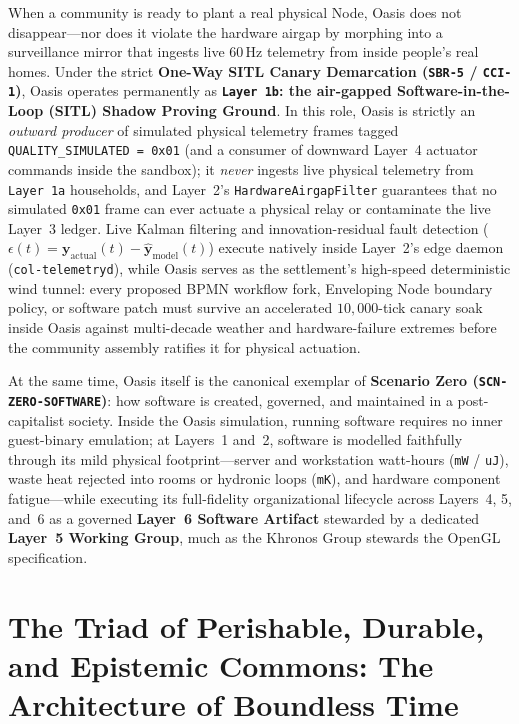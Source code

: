 When a community is ready to plant a real physical Node, Oasis does not disappear---nor does it violate the hardware airgap by morphing into a surveillance mirror that ingests live 60\,Hz telemetry from inside people's real homes. Under the strict \textbf{One-Way SITL Canary Demarcation (\texttt{SBR-5} / \texttt{CCI-1})}, Oasis operates permanently as \textbf{\texttt{Layer 1b}: the air-gapped Software-in-the-Loop (SITL) Shadow Proving Ground}. In this role, Oasis is strictly an \textit{outward producer} of simulated physical telemetry frames tagged \texttt{QUALITY\_SIMULATED = 0x01} (and a consumer of downward Layer~4 actuator commands inside the sandbox); it \textit{never} ingests live physical telemetry from \texttt{Layer 1a} households, and Layer~2's \texttt{HardwareAirgapFilter} guarantees that no simulated \texttt{0x01} frame can ever actuate a physical relay or contaminate the live Layer~3 ledger. Live Kalman filtering and innovation-residual fault detection ($\epsilon(t) = \mathbf{y}_{\mathrm{actual}}(t) - \hat{\mathbf{y}}_{\mathrm{model}}(t)$) execute natively inside Layer~2's edge daemon (\texttt{col-telemetryd}), while Oasis serves as the settlement's high-speed deterministic wind tunnel: every proposed BPMN workflow fork, Enveloping Node boundary policy, or software patch must survive an accelerated $10{,}000$-tick canary soak inside Oasis against multi-decade weather and hardware-failure extremes before the community assembly ratifies it for physical actuation.

At the same time, Oasis itself is the canonical exemplar of \textbf{Scenario Zero (\texttt{SCN-ZERO-SOFTWARE})}: how software is created, governed, and maintained in a post-capitalist society. Inside the Oasis simulation, running software requires no inner guest-binary emulation; at Layers~1 and~2, software is modelled faithfully through its mild physical footprint---server and workstation watt-hours (\texttt{mW} / \texttt{uJ}), waste heat rejected into rooms or hydronic loops (\texttt{mK}), and hardware component fatigue---while executing its full-fidelity organizational lifecycle across Layers~4, 5, and~6 as a governed \textbf{Layer~6 Software Artifact} stewarded by a dedicated \textbf{Layer~5 Working Group}, much as the Khronos Group stewards the OpenGL specification.

\section{The Triad of Perishable, Durable, and Epistemic Commons: The Architecture of Boundless Time}

